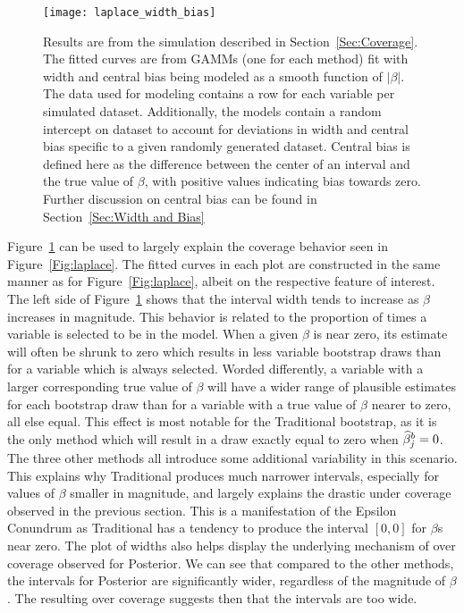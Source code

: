 \begin{figure}[hbtp]
  \begin{center}
  \texttt{[image: laplace\_width\_bias]}
  \caption{\label{Fig:laplace_width_bias} Results are from the simulation described in Section~\ref{Sec:Coverage}. The fitted curves are from GAMMs (one for each method) fit with width and central bias being modeled as a smooth function of $|\beta|$. The data used for modeling contains a row for each variable per simulated dataset. Additionally, the models contain a random intercept on dataset to account for deviations in width and central bias specific to a given randomly generated dataset. Central bias is defined here as the difference between the center of an interval and the true value of $\beta$, with positive values indicating bias towards zero. Further discussion on central bias can be found in Section~\ref{Sec:Width and Bias}}
  \end{center}
\end{figure}

Figure~\ref{Fig:laplace_width_bias} can be used to largely explain the coverage behavior seen in Figure~\ref{Fig:laplace}. The fitted curves in each plot are constructed in the same manner as for Figure~\ref{Fig:laplace}, albeit on the respective feature of interest. The left side of Figure~\ref{Fig:laplace_width_bias} shows that the interval width tends to increase as $\beta$ increases in magnitude. This behavior is related to the proportion of times a variable is selected to be in the model. When a given $\beta$ is near zero, its estimate will often be shrunk to zero which results in less variable bootstrap draws than for a variable which is always selected. Worded differently, a variable with a larger corresponding true value of $\beta$ will have a wider range of plausible estimates for each bootstrap draw than for a variable with a true value of $\beta$ nearer to zero, all else equal. This effect is most notable for the Traditional bootstrap, as it is the only method which will result in a draw exactly equal to zero when $\widehat{\beta}^b_j = 0$. The three other methods all introduce some additional variability in this scenario. This explains why Traditional produces much narrower intervals, especially for values of $\beta$ smaller in magnitude, and largely explains the drastic under coverage observed in the previous section. This is a manifestation of the Epsilon Conundrum as Traditional has a tendency to produce the interval $[0,0]$ for $\beta$s near zero. The plot of widths also helps display the underlying mechanism of over coverage observed for Posterior. We can see that compared to the other methods, the intervals for Posterior are significantly wider, regardless of the magnitude of $\beta$. The resulting over coverage suggests then that the intervals are too wide.

